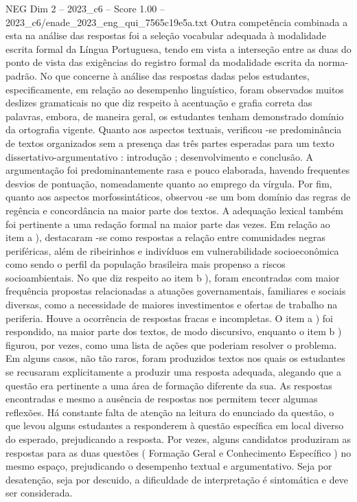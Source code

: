 \begin{textsample}{NEG Dim 2 – 2023\_c6 – Score 1.00 – 2023\_c6/enade\_2023\_eng\_qui\_7565c19e5a.txt}
Outra competência combinada a esta na análise das respostas foi a seleção vocabular adequada à modalidade escrita formal da Língua Portuguesa, tendo em vista a interseção entre as duas do ponto de vista das exigências do registro formal da modalidade escrita da norma-padrão.
No que concerne à análise das respostas dadas pelos estudantes, especificamente, em relação ao desempenho linguístico, foram observados muitos deslizes gramaticais no que diz respeito à acentuação e grafia correta das palavras, embora, de maneira geral, os estudantes tenham demonstrado domínio da ortografia vigente.
Quanto aos aspectos textuais, verificou -se predominância de textos organizados sem a presença das três partes esperadas para um texto dissertativo-argumentativo : introdução ; desenvolvimento e conclusão.
A argumentação foi predominantemente rasa e pouco elaborada, havendo frequentes desvios de pontuação, nomeadamente quanto ao emprego da vírgula.
Por fim, quanto aos aspectos morfossintáticos, observou -se um bom domínio das regras de regência e concordância na maior parte dos textos.
A adequação lexical também foi pertinente a uma redação formal na maior parte das vezes.
Em relação ao item a ), destacaram -se como respostas a relação entre comunidades negras periféricas, além de ribeirinhos e indivíduos em vulnerabilidade socioeconômica como sendo o perfil da população brasileira mais propenso a riscos socioambientais.
No que diz respeito ao item b ), foram encontradas com maior frequência propostas relacionadas a atuações governamentais, familiares e sociais diversas, como a necessidade de maiores investimentos e ofertas de trabalho na periferia.
Houve a ocorrência de respostas fracas e incompletas.
O item a ) foi respondido, na maior parte dos textos, de modo discursivo, enquanto o item b ) figurou, por vezes, como uma lista de ações que poderiam resolver o problema.
Em alguns casos, não tão raros, foram produzidos textos nos quais os estudantes se recusaram explicitamente a produzir uma resposta adequada, alegando que a questão era pertinente a uma área de formação diferente da sua.
As respostas encontradas e mesmo a ausência de respostas nos permitem tecer algumas reflexões.
Há constante falta de atenção na leitura do enunciado da questão, o que levou alguns estudantes a responderem à questão específica em local diverso do esperado, prejudicando a resposta.
Por vezes, alguns candidatos produziram as respostas para as duas questões ( Formação Geral e Conhecimento Específico ) no mesmo espaço, prejudicando o desempenho textual e argumentativo.
Seja por desatenção, seja por descuido, a dificuldade de interpretação é sintomática e deve ser considerada.

\end{textsample}
